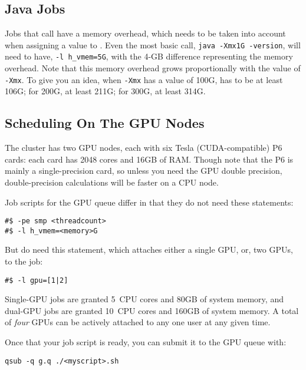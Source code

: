 \documentclass{easychair}
\begin{document}
\subsection{Java Jobs}

Jobs that call  have a memory overhead, which needs to be taken into account when assigning a value to . Even the most basic  call, \texttt{java -Xmx1G -version}, will need to have, \texttt{-l h\_vmem=5G}, with the 4-GB difference representing the memory overhead. Note that this memory overhead grows proportionally with the value of \texttt{-Xmx}. To give you an idea, when \texttt{-Xmx} has a value of 100G,  has to be at least 106G; for 200G, at least 211G; for 300G, at least 314G. 

\subsection{Scheduling On The GPU Nodes}

The cluster has two GPU nodes, each with six Tesla (CUDA-compatible) P6
cards: each card has 2048 cores and 16GB of RAM. Though note that the P6
is mainly a single-precision card, so unless you need the GPU double
precision, double-precision calculations will be faster on a CPU node.

Job scripts for the GPU queue differ in that they do not need these
statements:

\begin{verbatim}
#$ -pe smp <threadcount>
#$ -l h_vmem=<memory>G
\end{verbatim}

But do need this statement, which attaches either a single GPU, or, two
GPUs, to the job:

\begin{verbatim}
#$ -l gpu=[1|2]
\end{verbatim}

Single-GPU jobs are granted 5~CPU cores and 80GB of system memory, and
dual-GPU jobs are granted 10~CPU cores and 160GB of system memory. A
total of \emph{four} GPUs can be actively attached to any one user at any given
time.

Once that your job script is ready, you can submit it to the GPU queue
with:

\begin{verbatim}
qsub -q g.q ./<myscript>.sh
\end{verbatim}
\end{document}
